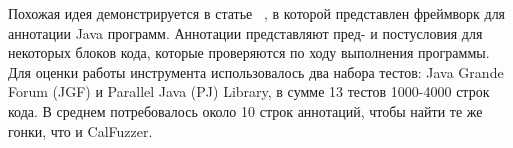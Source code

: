 Похожая идея демонстрируется в статье ~\cite{Burnim:2009}, в которой представлен фреймворк для аннотации Java программ. Аннотации представляют пред- и постусловия для некоторых блоков кода, которые проверяются по ходу выполнения программы. 
Для оценки работы инструмента использовалось два набора тестов: Java Grande Forum (JGF) и Parallel Java (PJ) Library, в сумме 13 тестов 1000-4000 строк кода. В среднем потребовалось около 10 строк аннотаций, чтобы найти те же гонки, что и CalFuzzer. 

%
%


